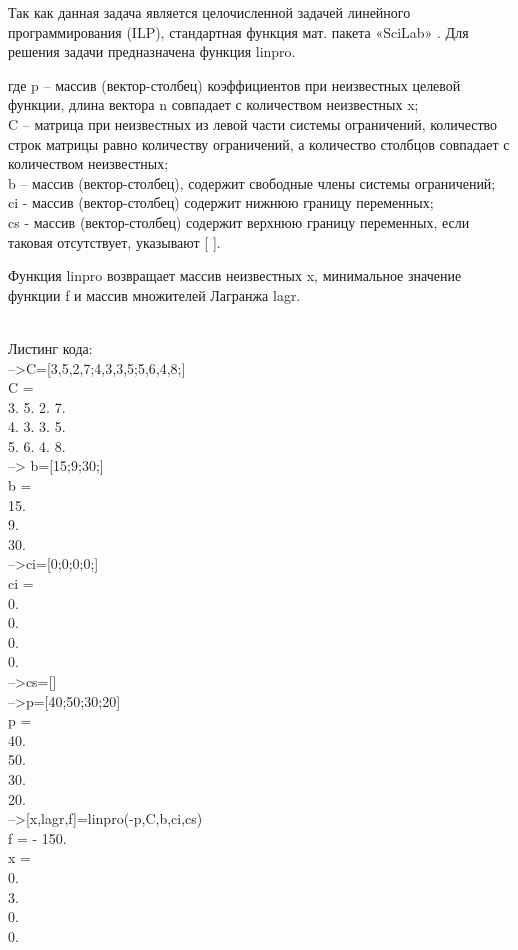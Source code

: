 \documentclass[russian,utf8,nocolumnxxxi,nocolumnxxxii]{eskdtext}
\begin{document}
Так как данная задача является целочисленной задачей линейного программирования (ILP), стандартная функция мат. пакета «SciLab» . Для решения задачи предназначена функция linpro.

где p  – массив (вектор-столбец) коэффициентов при неизвестных целевой функции, длина вектора n совпадает с количеством неизвестных x;\\
C   –  матрица при неизвестных из левой части системы ограничений,  количество строк матрицы равно количеству ограничений, а количество столбцов совпадает с количеством неизвестных;\\ 
b –  массив (вектор-столбец), содержит свободные члены системы ограничений; \\
ci - массив  (вектор-столбец) содержит нижнюю границу переменных; \\
cs - массив (вектор-столбец) содержит верхнюю границу переменных, если таковая отсутствует,  указывают [ ]. 

Функция linpro возвращает массив неизвестных x, минимальное значение функции f  и массив множителей Лагранжа lagr.

 \\Листинг кода:
\\-->C=[3,5,2,7;4,3,3,5;5,6,4,8;]
\\ C  =
 \\    3.    5.    2.    7.  
    \\4.    3.    3.    5.  
    \\5.    6.    4.    8.  
 \\--> b=[15;9;30;]  
 \\b  =
 \\    15.  
    \\9.   
    \\30.  
\\-->ci=[0;0;0;0;]
 \\ci  =
 \\   0.  
    \\0.  
   \\ 0.  
    \\0.  
 \\-->cs=[]
\\-->p=[40;50;30;20]
 \\p  =
    \\ 40.  
    \\50.  
    \\30.  
    \\20.  
\\ -->[x,lagr,f]=linpro(-p,C,b,ci,cs)
 \\f  =
   - 150.  
 \\x  =
    \\ 0.  
    \\3.  
    \\0.  
    \\0.
  
\end{document}
